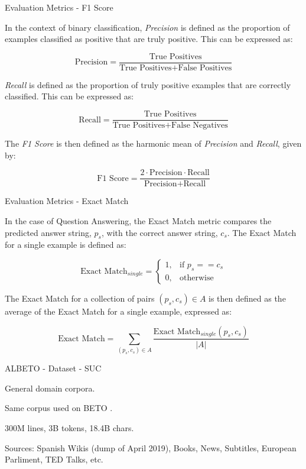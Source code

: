 \documentclass[aspectratio=169,xcolor=dvipsnames]{beamer}
\newenvironment{wideitemize}{\itemize\addtolength{\itemsep}{10pt}}{\enditemize}
\begin{document}
\begin{frame}{Evaluation Metrics - F1 Score}

In the context of binary classification, \textit{Precision} is defined as the proportion of examples classified as positive that are truly positive. This can be expressed as:

$$\text{Precision} = \frac{\text{True Positives}}{\text{True Positives} + \text{False Positives}}$$

\textit{Recall} is defined as the proportion of truly positive examples that are correctly classified. This can be expressed as:

$$\text{Recall} = \frac{\text{True Positives}}{\text{True Positives} + \text{False Negatives}}$$

The \textit{F1 Score} is then defined as the harmonic mean of \textit{Precision} and \textit{Recall}, given by:

$$\text{F1 Score} = \frac{2 \cdot \text{Precision} \cdot \text{Recall}}{\text{Precision} + \text{Recall}}$$


\end{frame}
\begin{frame}{Evaluation Metrics - Exact Match}

In the case of Question Answering, the Exact Match metric compares the predicted answer string, $p_s$, with the correct answer string, $c_s$. The Exact Match for a single example is defined as:

\[
    \text{Exact Match}_{single} = 
\begin{cases}
    1, & \text{if } p_s == c_s\\
    0,              & \text{otherwise}
\end{cases}
\]

The Exact Match for a collection of pairs $(p_s, c_s) \in A$ is then defined as the average of the Exact Match for a single example, expressed as:

$$\text{Exact Match} = \sum_{(p_s, c_s) \in A} \frac{\text{Exact Match}_{single}(p_s, c_s)}{|A|}$$

\end{frame}
\begin{frame}{ALBETO - Dataset - SUC}

\begin{wideitemize}
    \item General domain corpora.
    \item Same corpus \citep{canete-compilation-corpora} used on BETO \citep{CaneteCFP2020}.
    \item 300M lines, 3B tokens, 18.4B chars.
    \item Sources: Spanish Wikis (dump of April 2019), Books, News, Subtitles, European Parliment, TED Talks, etc.
\end{wideitemize}

\end{frame}
\end{document}
